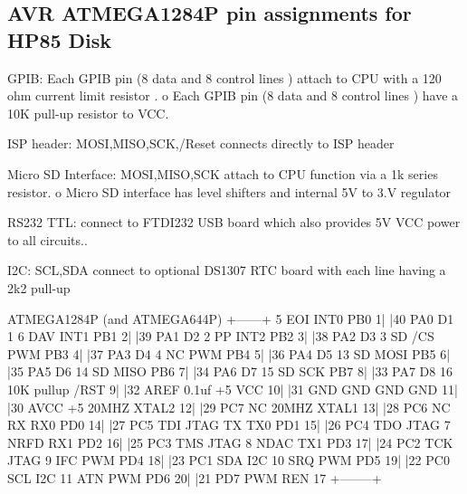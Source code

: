 \subsection*{A\-V\-R A\-T\-M\-E\-G\-A1284\-P pin assignments for H\-P85 Disk}


\begin{DoxyItemize}
\item G\-P\-I\-B\-: Each G\-P\-I\-B pin (8 data and 8 control lines ) attach to C\-P\-U with a 120 ohm current limit resistor . o Each G\-P\-I\-B pin (8 data and 8 control lines ) have a 10\-K pull-\/up resistor to V\-C\-C.
\item I\-S\-P header\-: M\-O\-S\-I,M\-I\-S\-O,S\-C\-K,/\-Reset connects directly to I\-S\-P header
\item Micro S\-D Interface\-: M\-O\-S\-I,M\-I\-S\-O,S\-C\-K attach to C\-P\-U function via a 1k series resistor. o Micro S\-D interface has level shifters and internal 5\-V to 3.\-V regulator
\item R\-S232 T\-T\-L\-: connect to F\-T\-D\-I232 U\-S\-B board which also provides 5\-V V\-C\-C power to all circuits..
\item I2\-C\-: S\-C\-L,S\-D\-A connect to optional D\-S1307 R\-T\-C board with each line having a 2k2 pull-\/up
\end{DoxyItemize}

\begin{DoxyVerb}                   ATMEGA1284P (and ATMEGA644P) 
                   +---\/---+ 
 5 EOI INT0  PB0  1|        |40  PA0      D1  1 
 6 DAV INT1  PB1  2|        |39  PA1      D2  2 
   PP  INT2  PB2  3|        |38  PA2      D3  3 
SD /CS  PWM  PB3  4|        |37  PA3      D4  4 
   NC   PWM  PB4  5|        |36  PA4      D5 13 
SD     MOSI  PB5  6|        |35  PA5      D6 14 
SD     MISO  PB6  7|        |34  PA6      D7 15 
SD      SCK  PB7  8|        |33  PA7      D8 16 
10K pullup  /RST  9|        |32  AREF     0.1uf 
   +5        VCC 10|        |31  GND      GND   
   GND       GND 11|        |30  AVCC     +5    
20MHZ      XTAL2 12|        |29  PC7      NC    
20MHZ      XTAL1 13|        |28  PC6      NC    
   RX   RX0  PD0 14|        |27  PC5  TDI JTAG 
   TX   TX0  PD1 15|        |26  PC4  TDO JTAG 
 7 NRFD RX1  PD2 16|        |25  PC3  TMS JTAG 
 8 NDAC TX1  PD3 17|        |24  PC2  TCK JTAG 
 9 IFC  PWM  PD4 18|        |23  PC1  SDA I2C   
10 SRQ  PWM  PD5 19|        |22  PC0  SCL I2C  
11 ATN  PWM  PD6 20|        |21  PD7  PWM REN 17 
                   +--------+ 
\end{DoxyVerb}
 



